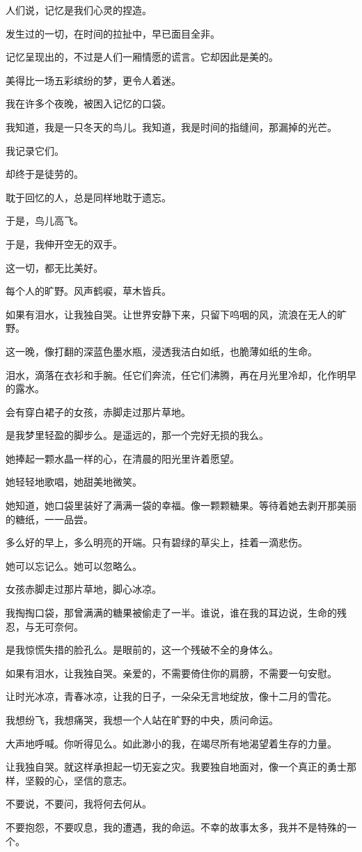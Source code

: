 \documentclass[12pt,a4paper]{article}
\begin{document}
		人们说，记忆是我们心灵的捏造。\par
		发生过的一切，在时间的拉扯中，早已面目全非。\par
		记忆呈现出的，不过是人们一厢情愿的谎言。它却因此是美的。\par
		美得比一场五彩缤纷的梦，更令人着迷。\par
		我在许多个夜晚，被困入记忆的口袋。\par
		我知道，我是一只冬天的鸟儿。我知道，我是时间的指缝间，那漏掉的光芒。

		我记录它们。\par
		却终于是徒劳的。\par
		耽于回忆的人，总是同样地耽于遗忘。\par
		于是，鸟儿高飞。\par
		于是，我伸开空无的双手。

		这一切，都无比美好。

	\endwriting



		每个人的旷野。风声鹤唳，草木皆兵。


		如果有泪水，让我独自哭。让世界安静下来，只留下呜咽的风，流浪在无人的旷野。\par
		这一晚，像打翻的深蓝色墨水瓶，浸透我洁白如纸，也脆薄如纸的生命。\par
		泪水，滴落在衣衫和手腕。任它们奔流，任它们沸腾，再在月光里冷却，化作明早的露水。\par
		会有穿白裙子的女孩，赤脚走过那片草地。\par
		是我梦里轻盈的脚步么。是遥远的，那一个完好无损的我么。\par
		她捧起一颗水晶一样的心，在清晨的阳光里许着愿望。\par
		她轻轻地歌唱，她甜美地微笑。\par
		她知道，她口袋里装好了满满一袋的幸福。像一颗颗糖果。等待着她去剥开那美丽的糖纸，一一品尝。\par
		多么好的早上，多么明亮的开端。只有碧绿的草尖上，挂着一滴悲伤。\par
		她可以忘记么。她可以忽略么。\par
		女孩赤脚走过那片草地，脚心冰凉。\par
		我掏掏口袋，那曾满满的糖果被偷走了一半。谁说，谁在我的耳边说，生命的残忍，与无可奈何。\par
		是我惊慌失措的脸孔么。是眼前的，这一个残破不全的身体么。

		如果有泪水，让我独自哭。亲爱的，不需要倚住你的肩膀，不需要一句安慰。\par
		让时光冰凉，青春冰凉，让我的日子，一朵朵无言地绽放，像十二月的雪花。\par
		我想纷飞，我想痛哭，我想一个人站在旷野的中央，质问命运。\par
		大声地呼喊。你听得见么。如此渺小的我，在竭尽所有地渴望着生存的力量。\par
		让我独自哭。就这样承担起一切无妄之灾。我要独自地面对，像一个真正的勇士那样，坚毅的心，坚信的意志。\par
		不要说，不要问，我将何去何从。\par
		不要抱怨，不要叹息，我的遭遇，我的命运。不幸的故事太多，我并不是特殊的一个。
\end{document}
